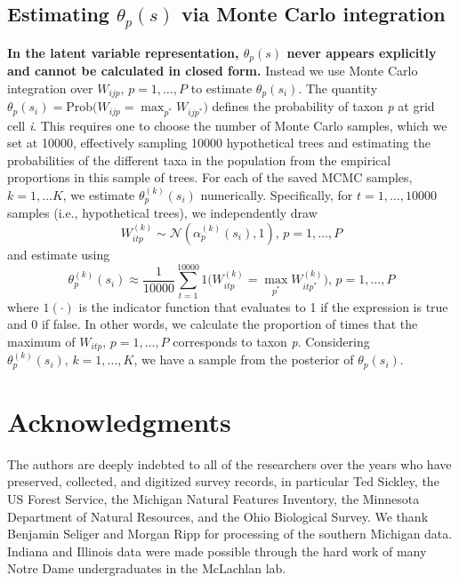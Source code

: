 \documentclass[10pt,letterpaper]{article}
\newcommand{\N}{\mathcal{N}}
\begin{document}
\subsection*{Estimating $\theta_{p}(s)$ via Monte Carlo integration}
\label{SI1}
{\bf In the latent variable representation, $\theta_{p}(s)$ never appears
explicitly and cannot be calculated in closed form.} Instead we use
Monte Carlo integration over $W_{ijp},\, p=1,\ldots,P$ to estimate
$\theta_{p}(s_{i})$. The quantity $\theta_{p}(s_{i})=\mbox{Prob}(W_{ijp}={\displaystyle \max_{p^{*}}W_{ijp^{*}})}$
defines the probability of taxon \emph{p} at grid cell \emph{i}. This requires
one to choose the number of Monte Carlo samples, which we set at 10000,
effectively sampling 10000 hypothetical trees and estimating the probabilities
of the different taxa in the population from the empirical proportions
in this sample of trees. For each of the saved MCMC samples, $k=1,\ldots K$,
we estimate $\theta_{p}^{(k)}(s_{i})$ numerically. Specifically,
for $t=1,\ldots,10000$ samples (i.e., hypothetical trees), we independently
draw
\[
W_{itp}^{(k)}\sim\N(\alpha_{p}^{(k)}(s_{i}),1),\, p=1,\ldots,P
\]
and estimate using 
\[
\theta_{p}^{(k)}(s_{i})\approx\frac{1}{10000}{\displaystyle \sum_{t=1}^{10000}1(W_{itp}^{(k)}={\displaystyle \max_{p^{*}}W_{itp^{*}}^{(k)})}},\, p=1,\ldots,P
\]
where $1(\cdot)$ is the indicator function that evaluates to 1 if
the expression is true and 0 if false. In other words, we calculate
the proportion of times that the maximum of $W_{itp},\, p=1,\ldots,P$
corresponds to taxon \emph{p}. Considering $\theta_{p}^{(k)}(s_{i}),\, k=1,\ldots,K$,
we have a sample from the posterior of $\theta_{p}(s_{i})$.

\section*{Acknowledgments}
The authors are deeply indebted to all of the researchers over the
years who have preserved, collected, and digitized survey records,
in particular Ted Sickley, the US Forest Service, the Michigan Natural Features Inventory, the Minnesota Department of Natural Resources, and the Ohio Biological Survey. We thank Benjamin Seliger and Morgan Ripp for processing of the southern Michigan data. Indiana and Illinois
data were made possible through the hard work of many Notre Dame undergraduates
in the McLachlan lab. 
\end{document}
